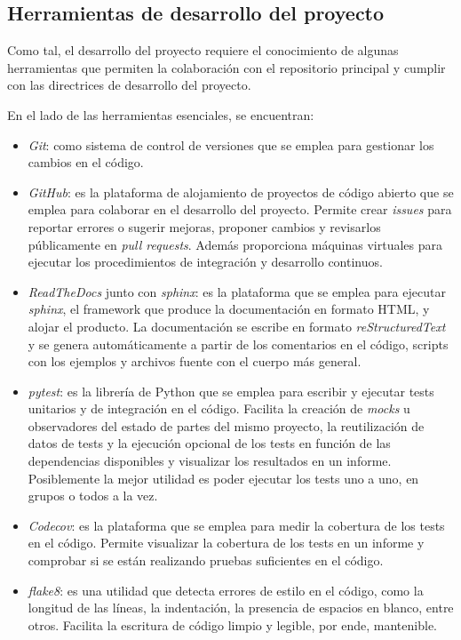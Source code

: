\subsection{Herramientas de desarrollo del proyecto} \label{ssct:pvlib:herramientas}

Como tal, el desarrollo del proyecto requiere el conocimiento de algunas herramientas que permiten la colaboración con el repositorio principal y cumplir con las directrices de desarrollo del proyecto.

En el lado de las herramientas esenciales, se encuentran:

\begin{itemize}
      \item \textit{Git}: como sistema de control de versiones que se emplea para gestionar los cambios en el código.
      \item \textit{GitHub}: es la plataforma de alojamiento de proyectos de código abierto que se emplea para colaborar en el desarrollo del proyecto. Permite crear \textit{issues} para reportar errores o sugerir mejoras, proponer cambios y revisarlos públicamente en \textit{pull requests}. Además proporciona máquinas virtuales para ejecutar los procedimientos de integración y desarrollo continuos.
      \item \textit{ReadTheDocs} junto con \textit{sphinx}: es la plataforma que se emplea para ejecutar \textit{sphinx}, el framework que produce la documentación en formato HTML, y alojar el producto. La documentación se escribe en formato \textit{reStructuredText} y se genera automáticamente a partir de los comentarios en el código, scripts con los ejemplos y archivos fuente con el cuerpo más general.
      \item \textit{pytest}: es la librería de Python que se emplea para escribir y ejecutar tests unitarios y de integración en el código. Facilita la creación de \textit{mocks} u observadores del estado de partes del mismo proyecto, la reutilización de datos de tests y la ejecución opcional de los tests en función de las dependencias disponibles y visualizar los resultados en un informe. Posiblemente la mejor utilidad es poder ejecutar los tests uno a uno, en grupos o todos a la vez.
      \item \textit{Codecov}: es la plataforma que se emplea para medir la cobertura de los tests en el código. Permite visualizar la cobertura de los tests en un informe y comprobar si se están realizando pruebas suficientes en el código.
      \item \textit{flake8}: es una utilidad que detecta errores de estilo en el código, como la longitud de las líneas, la indentación, la presencia de espacios en blanco, entre otros. Facilita la escritura de código limpio y legible, por ende, mantenible.

\end{itemize}


